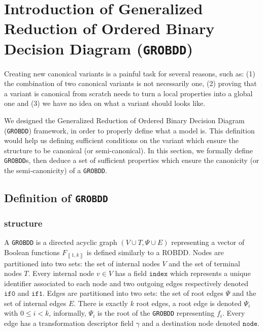 \documentclass[a4paper,10pt]{article}
\newcommand{\GroBdd}{\texttt{GROBDD}}
\newcommand{\fieldIndex}{\texttt{index}}
\newcommand{\fieldNode}{\texttt{node}}
\newcommand{\fieldThen}{\mathtt{if1}}
\newcommand{\fieldElse}{\mathtt{if0}}
\newcommand{\bras}[1]{{\left\llbracket{#1}\right\rrbracket}}
\begin{document}
\section{Introduction of Generalized Reduction of Ordered Binary Decision Diagram (\GroBdd{})}

Creating new canonical variants is a painful task for several reasons, such as: (1) the combination of two canonical variants is not necessarily one, (2) proving that a variant is canonical from scratch needs to turn a local properties into a global one and (3) we have no idea on what a variant should looks like.

We designed the Generalized Reduction of Ordered Binary Decision Diagram (\GroBdd{}) framework, in order to properly define what a model is.
This definition would help us defining sufficient conditions on the variant which ensure the structure to be canonical (or semi-canonical).
In this section, we formally define \GroBdd{}s, then deduce a set of sufficient properties which ensure the canonicity (or the semi-canonicity) of a \GroBdd{}.



\subsection{Definition of \GroBdd{}}

\subsubsection{structure}

A \GroBdd{} is a directed acyclic graph $(V\cup T, \Psi \cup E)$ representing a vector of Boolean functions $F_\bras{1, k}$ is defined similarly to a ROBDD.
Nodes are partitioned into two sets: the set of internal nodes $V$ and the set of terminal nodes $T$.
Every internal node $v\in V$ has a field $\fieldIndex{}$ which represents a unique identifier associated to each node and two outgoing edges respectively denoted $\fieldElse{}$ and $\fieldThen{}$.
Edges are partitioned into two sets: the set of root edges $\Psi$ and the set of internal edges $E$.
There is exactly $k$ root edges, a root edge is denoted $\Psi_i$ with $0\leq i < k$, informally, $\Psi_i$ is the root of the \GroBdd{} representing $f_i$.
Every edge has a transformation descriptor field $\gamma$ and a destination node denoted $\fieldNode{}$.
\end{document}
